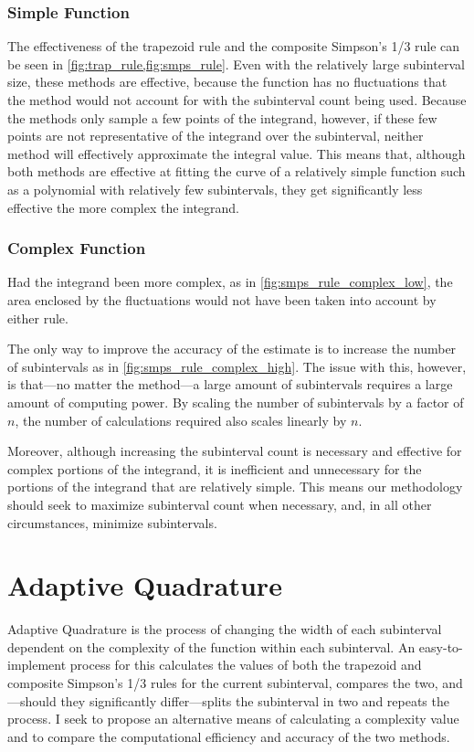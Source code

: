 \documentclass{paper}
\begin{document}
\subsubsection{Simple Function}
\label{sec:simple}
The effectiveness of the trapezoid rule and the composite Simpson's 1/3 rule can be seen in \cref{fig:trap_rule,fig:smps_rule}.
Even with the relatively large subinterval size, these methods are effective, because the function has no fluctuations that the method would not account for with the subinterval count being used.
Because the methods only sample a few points of the integrand, however, if these few points are not representative of the integrand over the subinterval, neither method will effectively approximate the integral value.
This means that, although both methods are effective at fitting the curve of a relatively simple function such as a polynomial with relatively few subintervals, they get significantly less effective the more complex the integrand.

\subsubsection{Complex Function}
\label{sec:complex_examples}
Had the integrand been more complex, as in \cref{fig:smps_rule_complex_low}, the area enclosed by the fluctuations would not have been taken into account by either rule.
%
%

%
The only way to improve the accuracy of the estimate is to increase the number of subintervals as in \cref{fig:smps_rule_complex_high}.
The issue with this, however, is that---no matter the method---a large amount of subintervals requires a large amount of computing power.
By scaling the number of subintervals by a factor of \(n\), the number of calculations required also scales linearly by \(n\).
%
%

%
Moreover, although increasing the subinterval count is necessary and effective for complex portions of the integrand, it is inefficient and unnecessary for the portions of the integrand that are relatively simple.
This means our methodology should seek to maximize subinterval count when necessary, and, in all other circumstances, minimize subintervals.

\section{Adaptive Quadrature}
\label{sec:adaptive}
Adaptive Quadrature is the process of changing the width of each subinterval dependent on the complexity of the function within each subinterval.
An easy-to-implement process for this calculates the values of both the trapezoid and composite Simpson's 1/3 rules for the current subinterval, compares the two, and---should they significantly differ---splits the subinterval in two and repeats the process.\autocite[p. 1]{established}
I seek to propose an alternative means of calculating a complexity value and to compare the computational efficiency and accuracy of the two methods.
\end{document}
